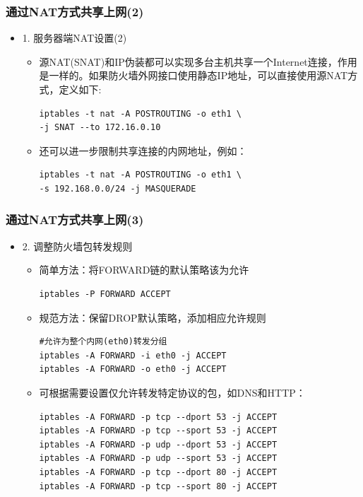 \documentclass[xcolor=svgnames,presentation]{beamer}
\begin{document}
\begin{frame}[fragile]
\frametitle{通过NAT方式共享上网(2)}
\label{sec-3-5}
\begin{itemize}

\item 1. 服务器端NAT设置(2)
\label{sec-3-5-1}%
\begin{itemize}

\item 源NAT(SNAT)和IP伪装都可以实现多台主机共享一个Internet连接，作用是一样的。如果防火墙外网接口使用静态IP地址，可以直接使用源NAT方式，定义如下:\\
\label{sec-3-5-1-1}%
\begin{verbatim}
iptables -t nat -A POSTROUTING -o eth1 \
-j SNAT --to 172.16.0.10
\end{verbatim}

\item 还可以进一步限制共享连接的内网地址，例如：\\
\label{sec-3-5-1-2}%
\begin{verbatim}
iptables -t nat -A POSTROUTING -o eth1 \
-s 192.168.0.0/24 -j MASQUERADE
\end{verbatim}
\end{itemize} %
\end{itemize} %
\end{frame}
\begin{frame}[fragile]
\frametitle{通过NAT方式共享上网(3)}
\label{sec-3-6}
\begin{itemize}

\item 2. 调整防火墙包转发规则
\label{sec-3-6-1}%
\begin{itemize}

\item 简单方法：将FORWARD链的默认策略该为允许\\
\label{sec-3-6-1-1}%
\begin{verbatim}
iptables -P FORWARD ACCEPT
\end{verbatim}

\item 规范方法：保留DROP默认策略，添加相应允许规则\\
\label{sec-3-6-1-2}%
\begin{verbatim}
#允许为整个内网(eth0)转发分组
iptables -A FORWARD -i eth0 -j ACCEPT
iptables -A FORWARD -o eth0 -j ACCEPT
\end{verbatim}

\item 可根据需要设置仅允许转发特定协议的包，如DNS和HTTP：\\
\label{sec-3-6-1-3}%
\begin{verbatim}
iptables -A FORWARD -p tcp --dport 53 -j ACCEPT
iptables -A FORWARD -p tcp --sport 53 -j ACCEPT
iptables -A FORWARD -p udp --dport 53 -j ACCEPT
iptables -A FORWARD -p udp --sport 53 -j ACCEPT
iptables -A FORWARD -p tcp --dport 80 -j ACCEPT
iptables -A FORWARD -p tcp --sport 80 -j ACCEPT
\end{verbatim}
\end{itemize} %
\end{itemize} %
\end{frame}
\end{document}

